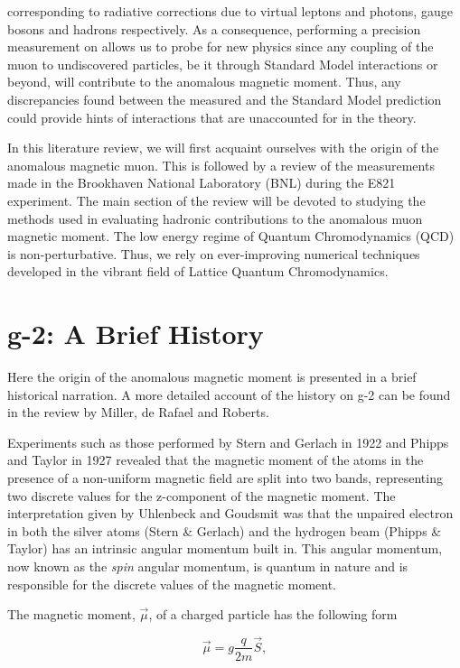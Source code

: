 \documentclass{article}
\numberwithin{equation}{section} %
\begin{document}
\noindent corresponding to radiative corrections due to virtual leptons and photons, gauge bosons and hadrons respectively. As a consequence, performing a precision measurement on \amu allows us to probe for new physics since any coupling of the muon to undiscovered particles, be it through Standard Model interactions or beyond, will contribute to the anomalous magnetic moment\cite{fermilab}. Thus, any discrepancies found between the measured \amu and the Standard Model prediction could provide hints of interactions that are unaccounted for in the theory. 

In this literature review, we will first acquaint ourselves with the origin of the anomalous magnetic muon. This is followed by a review of the measurements made in the Brookhaven National Laboratory (BNL) during the E821 experiment. The main section of the review will be devoted to studying the methods used in evaluating hadronic contributions to the anomalous muon magnetic moment. The  low energy  regime of Quantum Chromodynamics (QCD) is non-perturbative. Thus, we rely on ever-improving numerical techniques developed in the vibrant field of Lattice Quantum Chromodynamics.

\section{g-2: A Brief History}\label{hist}

Here the origin of the anomalous magnetic moment is presented in a brief historical narration. A more detailed account of the history on g-2 can be found in the review by Miller, de Rafael and Roberts\cite{millerg2}.

Experiments such as those performed by Stern and Gerlach in 1922 and Phipps and Taylor in 1927 revealed that the magnetic moment of the atoms in the presence of a non-uniform magnetic field are split into two bands, representing two discrete values for the z-component of the magnetic moment\cite{phipps}. The interpretation given by Uhlenbeck and Goudsmit was that the unpaired electron in both the silver atoms (Stern \& Gerlach) and the hydrogen beam (Phipps \& Taylor) has an intrinsic angular momentum built in. This angular momentum, now known as the \textit{spin} angular momentum, is quantum in nature and is responsible for the discrete values of the magnetic moment.

The magnetic moment, $\vec{\mu}$, of a charged particle has the following form\cite{hoecker}

\begin{equation}
\vec{\mu}=g\frac{q}{2m}\vec{S},
\label{magnetic moment}
\end{equation}
\end{document}
